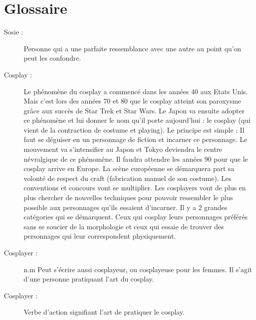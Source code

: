 \documentclass[a4paper,12pt]{article}
\begin{document}
\newpage



\newpage
\section*{Glossaire}
\begin{description}
\item [Sosie :] Personne qui a une parfaite ressemblance avec une autre au point qu'on peut les confondre.
\item [Cosplay :] Le phénomène du cosplay a commencé dans les années 40 aux Etats Unis. Mais c'est lors des années 70 et 80 que le cosplay atteint son paroxysme grâce aux succès de Star Trek et Star Wars. Le Japon va ensuite adopter ce phénomène et lui donner le nom qu'il porte aujourd'hui : le cosplay (qui vient de la contraction de costume et playing). Le principe est simple : Il faut se déguiser en un personnage de fiction et incarner ce personnage. Le mouvement va s'intensifier au Japon et Tokyo deviendra le centre névralgique de ce phénomène. Il faudra attendre les années 90 pour que le cosplay arrive en Europe. La scène européenne se démarquera part sa volonté de respect du craft (fabrication manuel de son costume). Les conventions et concours vont se multiplier. Les cosplayers vont de plus en plus chercher de nouvelles techniques pour pouvoir ressembler le plus possible aux personnages qu'ils essaient d'incarner. Il y a 2 grandes catégories qui se démarquent. Ceux qui cosplay leurs personnages préférés sans se soucier de la morphologie et ceux qui essaie de trouver des personnages qui leur correspondent physiquement.
\item [Cosplayer :] n.m Peut s'écrire aussi cosplayeur, ou cosplayeuse pour les femmes. Il s'agit d'une personne pratiquant l'art du cosplay. 
\item [Cosplayer :] Verbe d'action signifiant l'art de pratiquer le cosplay. 

\end{description}

\newpage
\end{document}
